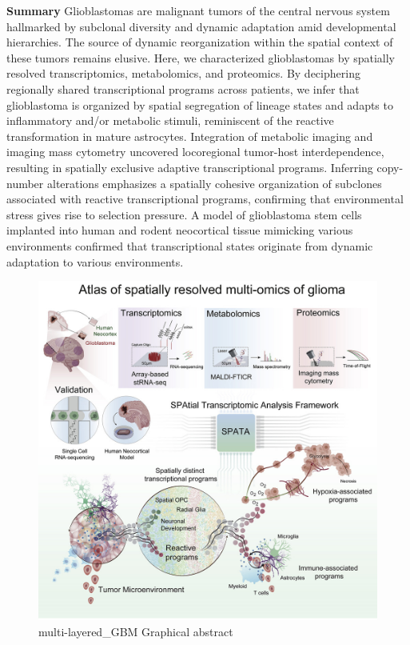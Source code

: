 \documentclass[
]{book}
\begin{document}
\textbf{Summary}
Glioblastomas are malignant tumors of the central nervous system hallmarked by subclonal diversity and dynamic adaptation amid developmental hierarchies. The source of dynamic reorganization within the spatial context of these tumors remains elusive. Here, we characterized glioblastomas by spatially resolved transcriptomics, metabolomics, and proteomics. By deciphering regionally shared transcriptional programs across patients, we infer that glioblastoma is organized by spatial segregation of lineage states and adapts to inflammatory and/or metabolic stimuli, reminiscent of the reactive transformation in mature astrocytes. Integration of metabolic imaging and imaging mass cytometry uncovered locoregional tumor-host interdependence, resulting in spatially exclusive adaptive transcriptional programs. Inferring copy-number alterations emphasizes a spatially cohesive organization of subclones associated with reactive transcriptional programs, confirming that environmental stress gives rise to selection pressure. A model of glioblastoma stem cells implanted into human and rodent neocortical tissue mimicking various environments confirmed that transcriptional states originate from dynamic adaptation to various environments\citep{ravi2022spatially}.

\begin{figure}
\centering
\includegraphics{./figs/spatialDatasets/multi-omicsGBM.jpg}
\caption{multi-layered\_GBM Graphical abstract}
\end{figure}
\end{document}
